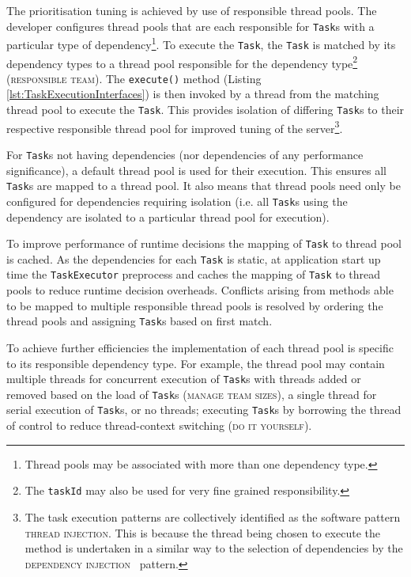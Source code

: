 \documentclass[prodmode]{style/acmlarge}
\begin{document}
The prioritisation tuning is achieved by use of responsible thread pools.  The
developer configures thread pools that are each responsible for \texttt{Task}s
with a particular type of dependency\footnote{Thread pools may be associated
with more than one dependency type.}.  To execute the \texttt{Task}, the
\texttt{Task} is matched by its dependency types to a thread pool responsible
for the dependency type\footnote{The \texttt{taskId} may also be used for very
fine grained responsibility.} (\textsc{responsible team}).  The
\texttt{execute()} method (Listing \ref{lst:TaskExecutionInterfaces}) is then
invoked by a thread from the matching thread pool to execute the \texttt{Task}.
This provides isolation of differing \texttt{Task}s to their respective
responsible thread pool for improved tuning of the server\footnote{The task
execution patterns are collectively identified as the software pattern
\textsc{thread injection}.  This is because the thread being chosen to execute
the method is undertaken in a similar way to the selection of dependencies by
the \textsc{dependency injection}~\cite{ioc} pattern.}.

For \texttt{Task}s not having dependencies (nor dependencies of any performance
significance), a default thread pool is used for their execution.  This ensures
all \texttt{Task}s are mapped to a thread pool.  It also means that thread pools
need only be configured for dependencies requiring isolation (i.e. all
\texttt{Task}s using the dependency are isolated to a particular thread pool for
execution).

To improve performance of runtime decisions the mapping of \texttt{Task} to
thread pool is cached.  As the dependencies for each \texttt{Task} is static, at
application start up time the \texttt{TaskExecutor} preprocess and caches the
mapping of \texttt{Task} to thread pools to reduce runtime decision overheads.
Conflicts arising from methods able to be mapped to multiple responsible thread
pools is resolved by ordering the thread pools and assigning \texttt{Task}s
based on first match.

To achieve further efficiencies the implementation of each thread pool is
specific to its responsible dependency type.  For example, the thread pool may
contain multiple threads for concurrent execution of \texttt{Task}s with threads
added or removed based on the load of \texttt{Task}s (\textsc{manage team sizes}),
a single thread for serial execution of \texttt{Task}s, or no threads;
executing \texttt{Task}s by borrowing the thread of control to reduce
thread-context switching (\textsc{do it yourself}).
\end{document}
